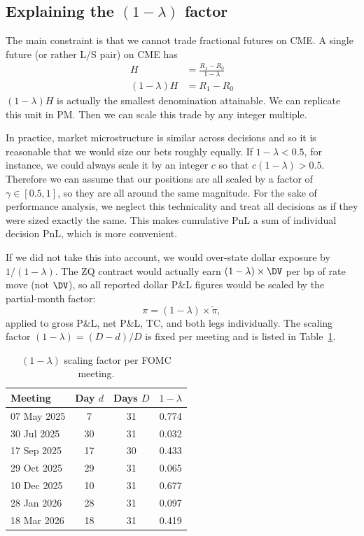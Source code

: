 \subsection{Explaining the $(1-\lambda)$ factor}

The main constraint is that we cannot trade fractional futures on CME. A single future (or rather L/S pair) on CME has 
\begin{align*}
    H &= \frac{R_1 - R_0}{1-\lambda}\\
    (1-\lambda)H &= R_1 - R_0
\end{align*}
$(1-\lambda)H$ is actually the smallest denomination attainable. We can replicate this unit in PM. Then we can scale this trade by any integer multiple. 


In practice, market microstructure is similar across decisions and so it is reasonable that we would size our bets roughly equally. If $1-\lambda<0.5$, for instance, we could always scale it by an integer $c$ so that $c(1-\lambda)>0.5$. Therefore we can assume that our positions are all scaled by a factor of $\gamma \in [0.5,1]$, so they are all around the same magnitude. For the sake of performance analysis, we neglect this technicality and treat all decisions as if they were sized exactly the same. This makes cumulative PnL a sum of individual decision PnL, which is more convenient. 

If we did not take this into account, we would over-state dollar exposure by $1/(1-\lambda)$.  The ZQ contract
would actually earn $(1-\lambda) \times \DV$ per bp of rate move (not $\DV$),
so all reported dollar P\&L figures would be scaled by the partial-month factor:
\begin{equation}
  \pi = (1-\lambda) \times \tilde{\pi},
  \label{eq:lambda_scaling}
\end{equation}
applied to gross P\&L, net P\&L, TC, and both legs individually. The scaling factor $(1-\lambda) = (D-d)/D$ is fixed per meeting and is listed in Table~\ref{tab:lambda}.

\begin{table}[h]
\centering
\caption{$(1-\lambda)$ scaling factor per FOMC meeting.}
\label{tab:lambda}
\begin{tabular}{@{} l c c c @{}}
\toprule
Meeting & Day $d$ & Days $D$ & $1-\lambda$ \\
\midrule
07 May 2025  &  7 & 31 & 0.774 \\
30 Jul 2025  & 30 & 31 & 0.032 \\
17 Sep 2025  & 17 & 30 & 0.433 \\
29 Oct 2025  & 29 & 31 & 0.065 \\
10 Dec 2025  & 10 & 31 & 0.677 \\
28 Jan 2026  & 28 & 31 & 0.097 \\
18 Mar 2026  & 18 & 31 & 0.419 \\
\bottomrule
\end{tabular}
\end{table}

